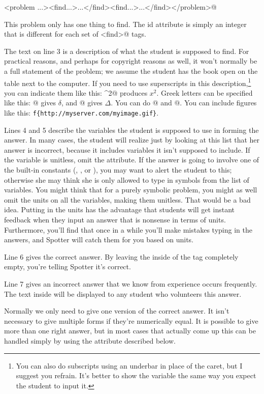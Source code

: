 \documentclass{doc}
\begin{document}
\noindent\verb@<problem ...><find...>...</find><find...>...</find></problem>@

This problem only has one thing to find. The id attribute is simply an integer
that is different for each set of \verb@<find>@ tags.

The text on line 3 is a description of what the student is supposed to find.
For practical reasons, and perhaps for copyright reasons as well, it won't
normally be a full statement of the problem; we assume the student has the
book open on the table next to the computer. If you need to use 
superscripts in this description,\footnote{You can also do subscripts using an underbar in place
of the caret,
but I suggest you refrain. It's
better to show the variable the same way you expect the student to input it.}
 you can indicate them like this:
\verb@x^{2}@ produces $x^2$. Greek letters can
be specified like this: @ gives $\delta$, and @ gives $\Delta$. 
You can do @ and @.
You can include figures like this: \verb|f{http://myserver.com/myimage.gif}|.

Lines 4 and 5 describe the variables the student is supposed to use in forming
the answer. In many cases, the student will realize just by looking at this list
that her answer is incorrect, because it includes variables it isn't supposed to
include. If the variable is unitless, omit the \verb@units@ attribute. If the answer
is going to involve one of the built-in constants (\verb@pi@, \verb@e@, or \verb@i@),
you may want to alert the student to this; otherwise she may think she is only
allowed to type in symbols from the list of variables. You might think that for
a purely symbolic problem, you might as well omit the units on all the variables,
making them unitless.
That would be a bad idea. Putting in the units has the advantage that students
will get instant feedback when they input an answer that is nonsense in terms of units.
Furthermore, you'll find that once in a while you'll make mistakes typing in the answers,
and Spotter will catch them for you based on units.

Line 6 gives the correct answer. By leaving the inside of the tag completely
empty, you're telling Spotter it's correct.

Line 7 gives an incorrect answer that we know from experience occurs frequently.
The text inside will be displayed to any student who volunteers this answer.

Normally we only need to give one version of the correct answer. It isn't necessary
to give multiple forms if they're numerically equal. It is possible to give more
than one right answer, but in most cases that actually come up this can be handled
simply by using the \verb@filter@ attribute described below.
\end{document}
